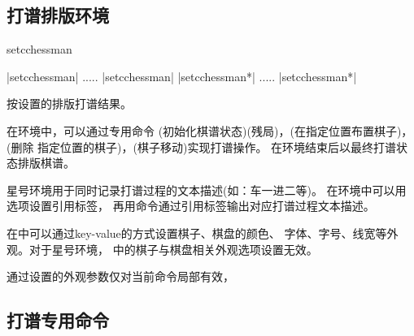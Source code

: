 \documentclass[full]{l3doc}
\begin{document}
\begin{documentation}
\subsection{打谱排版环境}

\begin{function}{setcchessman}
  \begin{syntax}
    |{setcchessman}|
    .....
    |{setcchessman}|
    |{setcchessman*}|
    .....
    |{setcchessman*}|
  \end{syntax}
\end{function}

  按设置的排版打谱结果。

  在环境中，可以通过专用命令%
  (初始化棋谱状态)(残局)，(在指定位置布置棋子)，(删除
  指定位置的棋子)，(棋子移动)实现打谱操作。
  在环境结束后以最终打谱状态排版棋谱。

  星号环境用于同时记录打谱过程的文本描述(如：车一进二等)。
  在环境中可以用选项设置引用标签，
  再用命令通过引用标签输出对应打谱过程文本描述。

  在中可以通过key-value的方式设置棋子、棋盘的颜色、
  字体、字号、线宽等外观。对于星号环境，%
  中的棋子与棋盘相关外观选项设置无效。

  通过设置的外观参数仅对当前命令局部有效，

\begin{SideBySideExample}[frame=single,numbers=left,
                xrightmargin=.48\linewidth,gobble=2]
  \centering
  \begin{setcchessman}
     
     
     
     
  \end{setcchessman}
\end{SideBySideExample}

\subsection{打谱专用命令}


\end{documentation}
\end{document}
